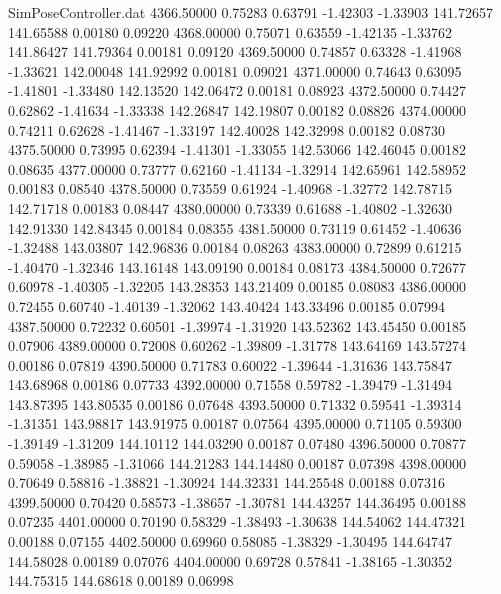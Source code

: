 \begin{filecontents}{SimPoseController.dat}
4366.50000    0.75283    0.63791    -1.42303   -1.33903  141.72657  141.65588    0.00180    0.09220
4368.00000    0.75071    0.63559    -1.42135   -1.33762  141.86427  141.79364    0.00181    0.09120
4369.50000    0.74857    0.63328    -1.41968   -1.33621  142.00048  141.92992    0.00181    0.09021
4371.00000    0.74643    0.63095    -1.41801   -1.33480  142.13520  142.06472    0.00181    0.08923
4372.50000    0.74427    0.62862    -1.41634   -1.33338  142.26847  142.19807    0.00182    0.08826
4374.00000    0.74211    0.62628    -1.41467   -1.33197  142.40028  142.32998    0.00182    0.08730
4375.50000    0.73995    0.62394    -1.41301   -1.33055  142.53066  142.46045    0.00182    0.08635
4377.00000    0.73777    0.62160    -1.41134   -1.32914  142.65961  142.58952    0.00183    0.08540
4378.50000    0.73559    0.61924    -1.40968   -1.32772  142.78715  142.71718    0.00183    0.08447
4380.00000    0.73339    0.61688    -1.40802   -1.32630  142.91330  142.84345    0.00184    0.08355
4381.50000    0.73119    0.61452    -1.40636   -1.32488  143.03807  142.96836    0.00184    0.08263
4383.00000    0.72899    0.61215    -1.40470   -1.32346  143.16148  143.09190    0.00184    0.08173
4384.50000    0.72677    0.60978    -1.40305   -1.32205  143.28353  143.21409    0.00185    0.08083
4386.00000    0.72455    0.60740    -1.40139   -1.32062  143.40424  143.33496    0.00185    0.07994
4387.50000    0.72232    0.60501    -1.39974   -1.31920  143.52362  143.45450    0.00185    0.07906
4389.00000    0.72008    0.60262    -1.39809   -1.31778  143.64169  143.57274    0.00186    0.07819
4390.50000    0.71783    0.60022    -1.39644   -1.31636  143.75847  143.68968    0.00186    0.07733
4392.00000    0.71558    0.59782    -1.39479   -1.31494  143.87395  143.80535    0.00186    0.07648
4393.50000    0.71332    0.59541    -1.39314   -1.31351  143.98817  143.91975    0.00187    0.07564
4395.00000    0.71105    0.59300    -1.39149   -1.31209  144.10112  144.03290    0.00187    0.07480
4396.50000    0.70877    0.59058    -1.38985   -1.31066  144.21283  144.14480    0.00187    0.07398
4398.00000    0.70649    0.58816    -1.38821   -1.30924  144.32331  144.25548    0.00188    0.07316
4399.50000    0.70420    0.58573    -1.38657   -1.30781  144.43257  144.36495    0.00188    0.07235
4401.00000    0.70190    0.58329    -1.38493   -1.30638  144.54062  144.47321    0.00188    0.07155
4402.50000    0.69960    0.58085    -1.38329   -1.30495  144.64747  144.58028    0.00189    0.07076
4404.00000    0.69728    0.57841    -1.38165   -1.30352  144.75315  144.68618    0.00189    0.06998

\end{filecontents}
